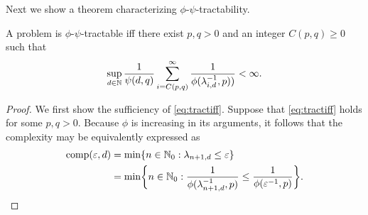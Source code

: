 \documentclass[11pt,a4paper]{article}
\begin{document}
Next we show a theorem characterizing $\phi$-$\psi$-tractability. 
\begin{theorem}\label{thm_main_tract} 
A problem is $\phi$-$\psi$-tractable iff there exist $p,q>0$ and an integer $C(p,q) \ge 0$ such that
\begin{equation} \label{eq:tractiff}
     \sup_{d \in \mathbb{N}} \frac{1}{\psi(d,q)} \sum_{i = C(p,q)}^\infty \frac{1}{\phi(\lambda_{i, d}^{-1},p))} < \infty.
\end{equation}
\end{theorem}
\begin{proof}
We first show the sufficiency of \eqref{eq:tractiff}. Suppose that \eqref{eq:tractiff} holds for some $p,q>0$. 
Because $\phi$ is increasing in its arguments, it follows that the complexity may be equivalently expressed as 
\begin{align*}
    \operatorname{comp}(\varepsilon, d) &= \min \{n \in \mathbb{N}_{0} : \lambda_{n+1, d} \le \varepsilon\} \\
    &= \min \biggl\{n \in \mathbb{N}_{0} : \frac{1}{\phi(\lambda_{n+1, d}^{-1},p)} \le \frac{1}{\phi(\varepsilon^{-1},p)} \biggr\}.
\end{align*}


\end{proof}
\end{document}
